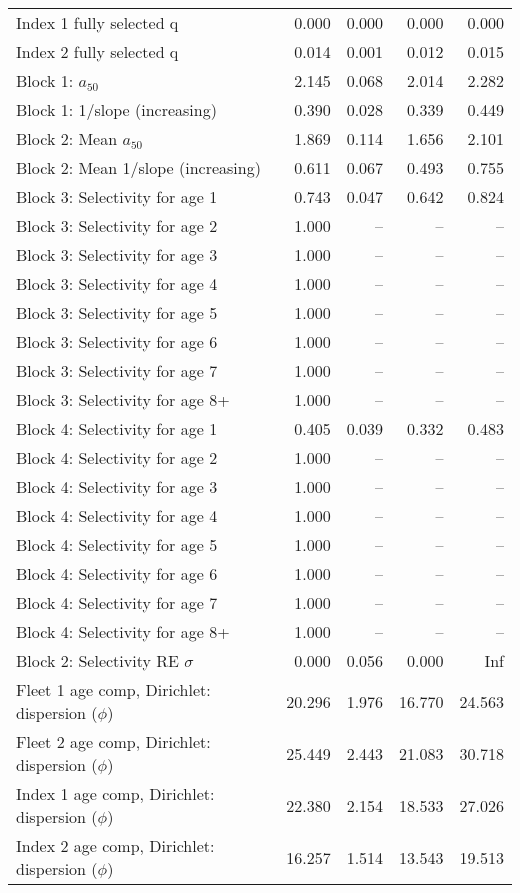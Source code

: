 \documentclass[
]{article}
\begin{document}
\begin{landscape}
\begin{longtable}[t]{lrrrr}
\endfoot
\bottomrule
\endlastfoot
Index 1 fully selected q & 0.000 & 0.000 & 0.000 & 0.000\\
Index 2 fully selected q & 0.014 & 0.001 & 0.012 & 0.015\\
Block 1: $a_{50}$ & 2.145 & 0.068 & 2.014 & 2.282\\
Block 1: 1/slope (increasing) & 0.390 & 0.028 & 0.339 & 0.449\\
Block 2: Mean $a_{50}$ & 1.869 & 0.114 & 1.656 & 2.101\\
\addlinespace
Block 2: Mean 1/slope (increasing) & 0.611 & 0.067 & 0.493 & 0.755\\
Block 3: Selectivity for age 1 & 0.743 & 0.047 & 0.642 & 0.824\\
Block 3: Selectivity for age 2 & 1.000 & -- & -- & --\\
Block 3: Selectivity for age 3 & 1.000 & -- & -- & --\\
Block 3: Selectivity for age 4 & 1.000 & -- & -- & --\\
\addlinespace
Block 3: Selectivity for age 5 & 1.000 & -- & -- & --\\
Block 3: Selectivity for age 6 & 1.000 & -- & -- & --\\
Block 3: Selectivity for age 7 & 1.000 & -- & -- & --\\
Block 3: Selectivity for age 8+ & 1.000 & -- & -- & --\\
Block 4: Selectivity for age 1 & 0.405 & 0.039 & 0.332 & 0.483\\
\addlinespace
Block 4: Selectivity for age 2 & 1.000 & -- & -- & --\\
Block 4: Selectivity for age 3 & 1.000 & -- & -- & --\\
Block 4: Selectivity for age 4 & 1.000 & -- & -- & --\\
Block 4: Selectivity for age 5 & 1.000 & -- & -- & --\\
Block 4: Selectivity for age 6 & 1.000 & -- & -- & --\\
\addlinespace
Block 4: Selectivity for age 7 & 1.000 & -- & -- & --\\
Block 4: Selectivity for age 8+ & 1.000 & -- & -- & --\\
Block 2: Selectivity RE $\sigma$ & 0.000 & 0.056 & 0.000 & Inf\\
Fleet 1 age comp, Dirichlet: dispersion ($\phi$) & 20.296 & 1.976 & 16.770 & 24.563\\
Fleet 2 age comp, Dirichlet: dispersion ($\phi$) & 25.449 & 2.443 & 21.083 & 30.718\\
\addlinespace
Index 1 age comp, Dirichlet: dispersion ($\phi$) & 22.380 & 2.154 & 18.533 & 27.026\\
Index 2 age comp, Dirichlet: dispersion ($\phi$) & 16.257 & 1.514 & 13.543 & 19.513\\*
\end{longtable}
\end{landscape}
\end{document}
